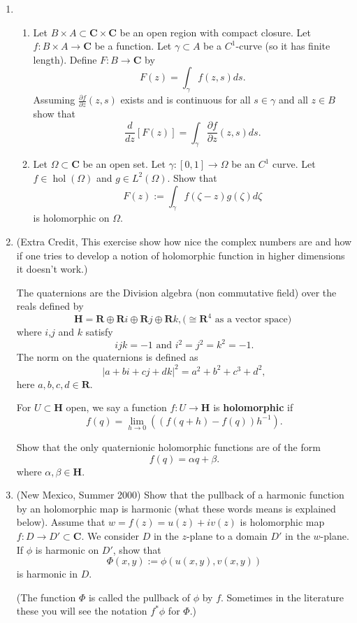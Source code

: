 \documentclass[a4paper,10pt]{article}
\newcommand{\RR}{\mathbf{R}}
\newcommand{\CC}{\mathbf{C}}
\newcommand{\hol}{\operatorname{hol}}
\begin{document}
\begin{enumerate}
\item 
\begin{enumerate}
\item 
Let $B\times A \subset \CC \times \CC$ be an open region with compact closure.
Let $f: B\times A \to \CC$ be a function.  Let $\gamma \subset A$ be a $C^1$-curve (so it has finite length). 
Define $F: B \to \CC$ by  
 $$ F(z) = \int_{\gamma} f(z,s) ds.$$
Assuming $\frac{\partial f}{\partial z}(z,s)$ exists and is continuous for all $s \in \gamma$ and all $z \in B$ show that 
 $$ \frac{d}{dz}[ F(z)] = \int_{\gamma} \frac{\partial f}{\partial z}(z,s) ds. $$
\item Let $\Omega \subset \CC$ be an open set. Let $\gamma:[0,1]\to \Omega$ be an $C^1$ curve. 
Let $f \in \hol(\Omega)$ and $g \in L^2(\Omega)$. Show that 
 $$ F(z) := \int_{\gamma} f(\zeta-z)g(\zeta)d \zeta $$ 
is holomorphic on $\Omega$.
\end{enumerate}

\item (Extra Credit, This exercise show how nice the complex numbers are and how if one tries to develop a notion of holomorphic function in higher dimensions it doesn't work.)

The quaternions are the Division algebra (non commutative field) over the reals defined by 
 $$\mathbf{H} = \RR \oplus \RR i \oplus \RR j \oplus \RR k, \mbox{($\cong \RR^4$ as a vector space) } $$ 
where $i$,$j$ and $k$ satisfy
 $$ ijk = -1 \mbox{ and } i^2 = j^2 = k^2 = -1.$$
The norm on the quaternions is defined as 
 $$ \vert a+bi+cj+dk \vert^2 = a^2 + b^2 + c^3 + d^2,$$
here $a,b,c,d \in\RR$.

For $U\subset \mathbf{H}$ open, we say a function $f: U \to \mathbf{H}$ is \textbf{holomorphic} if 
 $$ f(q) = \lim_{h\to 0} \left( (f(q+h)-f(q))h^{-1}  \right). $$
 

Show that the only quaternionic holomorphic functions are of the form 
 $$f(q) = \alpha q + \beta.$$
 where $\alpha,\beta \in \mathbf{H}$.

\item (New Mexico, Summer 2000)
Show that the pullback of a harmonic function by an holomorphic map is harmonic (what these words means is explained below).
Assume that $w = f(z) = u(z)+iv(z)$ is holomorphic map $f:D \to D' \subset \CC$. We consider $D$ in the $z$-plane to a domain $D'$ in the $w$-plane. 
If $\phi$ is harmonic on $D'$, show that 
 $$ \Phi(x,y) := \phi(u(x,y),v(x,y))$$
is harmonic in $D$. 

(The function $\Phi$ is called the pullback of $\phi$ by $f$. Sometimes in the literature these you will see the notation $f^*\phi$ for $\Phi$.)


\end{enumerate}
\end{document}
